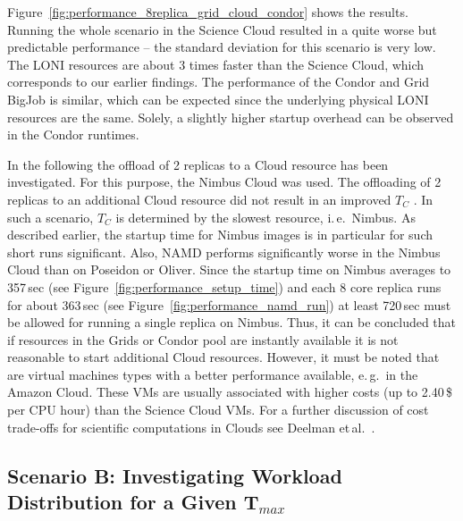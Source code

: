 \documentclass[conference,final]{IEEEtran}
\newcommand{\up}{\vspace*{-1em}}
\newcommand{\tc}{$T_{C}$ }
\begin{document}
Figure~\ref{fig:performance_8replica_grid_cloud_condor} shows the results. 
Running the whole scenario in the Science Cloud resulted
in a quite worse but predictable performance -- the standard deviation for this scenario
is very low. The LONI resources are about 3 times faster than
the Science Cloud, which corresponds to our earlier findings. 
The performance of the Condor and Grid BigJob is similar, which can 
be expected since the underlying physical LONI resources are the same. 
Solely, a slightly higher startup overhead can be observed in the Condor runtimes.

In the following the offload of 2 replicas to a Cloud resource has
been investigated. For this purpose, the Nimbus Cloud was used. The
offloading of 2 replicas to an additional Cloud resource did not
result in an improved \tc. In such a scenario, \tc is determined by
the slowest resource, i.\,e.\ Nimbus. As described earlier, the
startup time for Nimbus images is in particular for such short runs
significant. Also, NAMD performs significantly worse in the Nimbus
Cloud than on Poseidon or Oliver. Since the startup time on Nimbus
averages to 357\,sec (see Figure~\ref{fig:performance_setup_time}) and
each 8 core replica runs for about 363\,sec (see
Figure~\ref{fig:performance_namd_run}) at least 720\,sec must be
allowed for running a single replica on Nimbus. Thus, it can be
concluded that if resources in the Grids or Condor pool are instantly
available it is not reasonable to start additional Cloud resources.
However, it must be noted that are virtual machines types with a
better performance available, e.\,g.\ in the Amazon Cloud. These VMs
are usually associated with higher costs (up to 2.40\,\$ per CPU hour)
than the Science Cloud VMs. For a further discussion of cost
trade-offs for scientific computations in Clouds see Deelman
et\,al.~\cite{1413421}.



\subsection{Scenario B: Investigating Workload Distribution for a Given T$_{max}$}
\up
\end{document}
